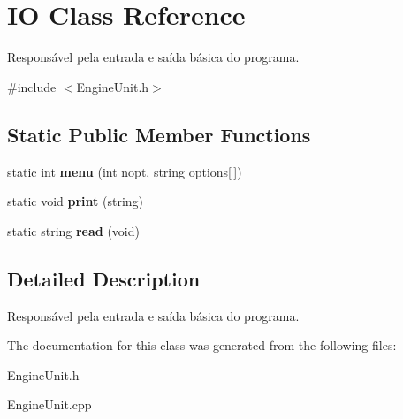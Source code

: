 \hypertarget{classIO}{\section{I\-O Class Reference}
\label{d8/d66/classIO}
}


Responsável pela entrada e saída básica do programa.  




{\ttfamily \#include $<$Engine\-Unit.\-h$>$}

\subsection*{Static Public Member Functions}
\begin{DoxyCompactItemize}
\item 
\hypertarget{classIO_a0526219a3a6d52159831f92dd5c87939}{static int {\bfseries menu} (int nopt, string options\mbox{[}$\,$\mbox{]})}\label{d8/d66/classIO_a0526219a3a6d52159831f92dd5c87939}

\item 
\hypertarget{classIO_a5bd9392aa8050a8a27991df7d092832d}{static void {\bfseries print} (string)}\label{d8/d66/classIO_a5bd9392aa8050a8a27991df7d092832d}

\item 
\hypertarget{classIO_ae22d648496c5ab2e977cde4f4c3d4924}{static string {\bfseries read} (void)}\label{d8/d66/classIO_ae22d648496c5ab2e977cde4f4c3d4924}

\end{DoxyCompactItemize}


\subsection{Detailed Description}
Responsável pela entrada e saída básica do programa. 



The documentation for this class was generated from the following files\-:\begin{DoxyCompactItemize}
\item 
Engine\-Unit.\-h\item 
Engine\-Unit.\-cpp\end{DoxyCompactItemize}
